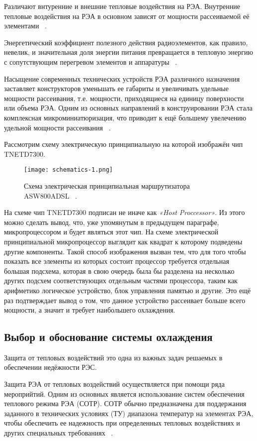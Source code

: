 Различают внтуренние и внешние тепловые воздействия на РЭА.
Внутренние тепловые воздействия на РЭА в основном зависят от мощности
рассеиваемой её элементами ~\cite{Rotkop1976}.

Энергетический коэффициент полезного действия радиоэлементов, как
правило, невелик, и значительная доля энергии питания превращается в
тепловую энергию с сопутствующим перегревом элементов и аппаратуры
~\cite{Rotkop1976}.

Насыщение современных технических устройств РЭА различного назначения
заставляет конструкторов уменьшать ее габариты и увеличивать удельные
мощности рассеивания, т.е. мощности, приходящиеся на единицу
поверхности или объема РЭА. Одним из основных направлений в
конструировании РЭА стала комплексная микроминиатюризация, что
приводит к ещё большему увелечению удельной мощности рассеивания
~\cite{Rotkop1976}.

Рассмотрим схему электрическую принципиальную на которой изображён чип
TNETD7300.

\begin{figure}[hb]
  \centering
  \texttt{[image: schematics-1.png]}
  \caption{Схема электрическая принципиальная
    маршрутизатора ASW800ADSL ~\cite{SCHEMATICS}.}
\end{figure}

На схеме чип TNETD7300 подписан не иначе как \textit{«Host Proccessor»}.
Из этого можно сделать вывод, что, уже упомянутым в предыдущем
параграфе, микропроцессором и будет являться этот чип.  На схеме
электрической принципиальной микропроцессор выглядит как квадрат к
которому подведены другие компоненты. Такой способ изображения вызван
тем, что для того чтобы показать все элементы из которых состоит
процессор требуется отдельная большая подсхема, которая в свою очередь
была бы разделена на несколько других подсхем соответствующих
отдельным частями процессора, таким как арифметико логическое
устройство, блок управления памятью и другие. Это ещё раз подтверждает
вывод о том, что данное устройство рассеивает больше всего мощности, а
значит и требует наибольшего охлаждения.

\subsection{Выбор и обоснование системы охлаждения}

Защита от тепловых воздействий это одна из важных задач решаемых в обеспечении недёжности РЭС.

Защита РЭА от тепловых воздействий осуществляется при помощи ряда мероприйтий. Одним из основных является использование систем обеспечения теплового режима РЭА (СОТР). СОТР обычно предназначена для поддержания заданного в технических условиях (ТУ) диапазона температур на элементах РЭА, чтобы обеспечить ее надежность при определенных тепловых воздействиях и других специальных требованиях ~\cite{Rotkop1976}.

